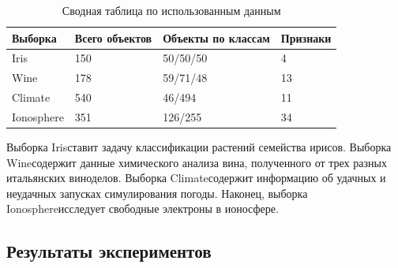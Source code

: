 \documentclass[12pt]{article}
\begin{document}
\begin{savenotes}
\begin{table}[!htbp]
  \begin{tabu}{X X[2] X[2] X}
    Выборка & Всего объектов & Объекты по классам & Признаки \\ \hline
    Iris\footnotemark[1] & 150 & 50/50/50 & 4   \\
    Wine\footnotemark[2] & 178 & 59/71/48 & 13  \\
    Climate\footnotemark[3] & 540 & 46/494   & 11  \\
    Ionosphere\footnotemark[4] & 351 & 126/255  & 34  \\
  \end{tabu}
  \caption{Сводная таблица по использованным данным}
  \label{tab:data}
\end{table}
\end{savenotes}

Выборка Iris\footnotemark[1] ставит задачу классификации растений
семейства ирисов. Выборка Wine\footnotemark[2] содержит данные
химического анализа вина, полученного от трех разных итальянских
виноделов. Выборка Climate\footnotemark[3] содержит информацию об
удачных и неудачных запусках симулирования погоды. Наконец, выборка
Ionosphere\footnotemark[4] исследует свободные электроны в ионосфере.


\subsection{Результаты экспериментов}
\end{document}
